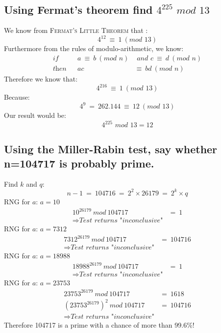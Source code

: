 \documentclass{report}
\begin{document}
		\subsection{Using Fermat’s theorem find $4^{225} \textit{ mod } 13$}
		\startsubsection
			We know from \textsc{Fermat's Little Theorem} that :
			\[
				4^{12} \ \equiv \ 1 \ (\textit{mod } 13)
			\]
			Furthermore from the rules of modulo-arithmetic, we know:
			\begin{align*}
				\textit{if} && a \ \equiv \ b \ (\textit{mod } n) &\textit{ and } c \ \equiv \ d \ (\textit{mod } n) \\
				\textit{then} && ac \ &\equiv \ bd \ (\textit{mod } n)
			\end{align*}
			Therefore we know that:
			\[
				4^{216} \ \equiv \ 1 \ (\textit{mod } 13)
			\]
			Because:
			\[
				4^{9} \ = \ 262.144 \ \equiv \ 12 \ (\textit{mod } 13)
			\]
			Our result would be:
			\[
				4^{225} \textit{ mod } 13 = 12
			\]
		\closesection
		\subsection{Using the Miller-Rabin test, say whether n=104717 is probably prime.}
		\startsubsection
			Find $k$ and $q$:
			\[
				n-1 \ = \ 104716 \ = \ 2^2 \times 26179 \ = \ 2^k \times q
			\]
			RNG for $a$: $a = 10$
			\begin{align*}
				10^{26179} \ mod \ 104717 \ & = \ 1 \\
				\Rightarrow \textit{Test returns "inconclusive"}
			\end{align*}
			RNG for $a$: $a = 7312$
			\begin{align*}
				7312^{26179} \ mod \ 104717 \ & = \ 104716 \\
				\Rightarrow \textit{Test returns "inconclusive"}
			\end{align*}
			RNG for $a$: $a = 18988$
			\begin{align*}
				18988^{26179} \ mod \ 104717 \ & = \ 1 \\
				\Rightarrow \textit{Test returns "inconclusive"}
			\end{align*}
			RNG for $a$: $a = 23753$
			\begin{align*}
				23753^{26179} \ mod \ 104717 \ & = \ 1618 \\
				(23753^{26179})^2 \ mod \ 104717 \ & = \ 104716 \\
				\Rightarrow \textit{Test returns "inconclusive"}
			\end{align*}
			Therefore 104717 is a prime with a chance of more than 99.6\%!
		\closesection
\end{document}
